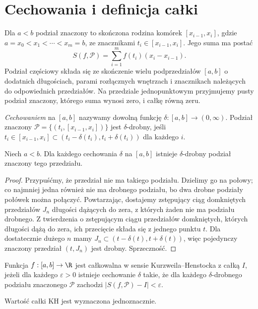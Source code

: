 \section{Cechowania i definicja całki}
\begin{definicja}
\label{ma1:kh:def:kh-gauge}\label{it:def:kh-gauge}
Dla $a<b$ podział znaczony to skończona rodzina komórek $[x_{i-1},x_i]$, gdzie $a=x_0<x_1<\cdots<x_m=b$, ze znacznikami $t_i\in[x_{i-1},x_i]$. Jego suma ma postać
\[
 S(f,\mathcal P)=\sum_{i=1}^m f(t_i)(x_i-x_{i-1}).
\]
Podział częściowy składa się ze skończenie wielu podprzedziałów $[a,b]$ o dodatnich długościach, parami rozłącznych wnętrzach i znacznikach należących do odpowiednich przedziałów. Na przedziale jednopunktowym przyjmujemy pusty podział znaczony, którego suma wynosi zero, i całkę równą zeru.


\emph{Cechowaniem} na $[a,b]$ nazywamy dowolną funkcję $\delta:[a,b]\to(0,\infty)$. Podział znaczony $\mathcal P=\{(t_i,[x_{i-1},x_i])\}$ jest $\delta$-drobny, jeśli $t_i\in[x_{i-1},x_i]\subset(t_i-\delta(t_i),t_i+\delta(t_i))$ dla każdego $i$.
\end{definicja}
\begin{lemat}[Cousina]\label{ma1:kh:lem:kh-cousin}\label{it:lem:kh-cousin}
Niech $a<b$. Dla każdego cechowania $\delta$ na $[a,b]$ istnieje $\delta$-drobny podział znaczony tego przedziału.
\end{lemat}
\begin{proof}
Przypuśćmy, że przedział nie ma takiego podziału. Dzielimy go na połowy; co najmniej jedna również nie ma drobnego podziału, bo dwa drobne podziały połówek można połączyć. Powtarzając, dostajemy zstępujący ciąg domkniętych przedziałów $J_n$ długości dążących do zera, z których żaden nie ma podziału drobnego. Z twierdzenia o zstępującym ciągu przedziałów domkniętych, których długości dążą do zera, ich przecięcie składa się z jednego punktu $t$. Dla dostatecznie dużego $n$ mamy $J_n\subset(t-\delta(t),t+\delta(t))$, więc pojedynczy znaczony przedział $(t,J_n)$ jest drobny. Sprzeczność.
\end{proof}
\begin{definicja}
\label{ma1:kh:def:kh-integral}\label{it:def:kh-integral}
Funkcja $f:[a,b]\to\R$ jest całkowalna w sensie Kurzweila--Henstocka z całką $I$, jeżeli dla każdego $\varepsilon>0$ istnieje cechowanie $\delta$ takie, że dla każdego $\delta$-drobnego podziału znaczonego $\mathcal P$ zachodzi $|S(f,\mathcal P)-I|<\varepsilon$.
\end{definicja}
\begin{stwierdzenie}[Jednoznaczność]
\label{ma1:kh:prop:kh-unique}\label{it:prop:kh-unique}
Wartość całki KH jest wyznaczona jednoznacznie.
\end{stwierdzenie}
